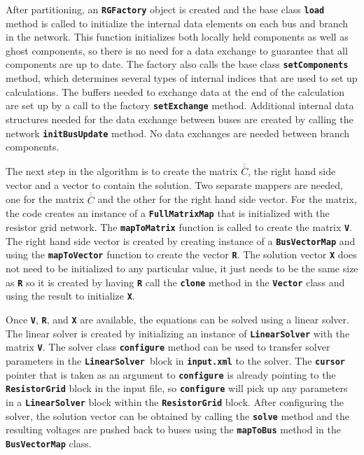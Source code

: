 After partitioning, an \texttt{\textbf{RGFactory}} object is created and the base class \texttt{\textbf{load}} method is called to initialize the internal data elements on each bus and branch in the network. This function initializes both locally held components as well as ghost components, so there is no need for a data exchange to guarantee that all components are up to date. The factory also calls the base class \texttt{\textbf{setComponents}} method, which determines several types of internal indices that are used to set up calculations. The buffers needed to exchange data at the end of the calculation are set up by a call to the factory \texttt{\textbf{setExchange}} method. Additional internal data structures needed for the data exchange between buses are created by calling the network \texttt{\textbf{initBusUpdate}} method. No data exchanges are needed between branch components.

The next step in the algorithm is to create the matrix
$\overline{\overline{C}}$, the right hand side vector and a vector to contain
the solution. Two separate mappers are needed, one for the matrix
$\overline{\overline{C}}$ and the other for the right hand side vector. For the
matrix, the code creates an instance of a \texttt{\textbf{FullMatrixMap}} that
is initialized with the resistor grid network. The \texttt{\textbf{mapToMatrix}}
function is called to create the matrix \texttt{\textbf{V}}. The right hand side
vector is created by creating instance of a \texttt{\textbf{BusVectorMap}} and
using the \texttt{\textbf{mapToVector}} function to create the vector
\texttt{\textbf{R}}. The solution vector \texttt{\textbf{X}} does not need to be
initialized to any particular value, it just needs to be the same size as
\texttt{\textbf{R}} so it is created by having \texttt{\textbf{R}} call the
\texttt{\textbf{clone}} method in the \texttt{\textbf{Vector}} class and using
the result to initialize \texttt{\textbf{X}}.

Once \texttt{\textbf{V}}, \texttt{\textbf{R}}, and \texttt{\textbf{X}} are available, the equations can be solved using a linear solver. The linear solver is created by initializing an instance of \texttt{\textbf{LinearSolver}} with the matrix \texttt{\textbf{V}}. The solver class \texttt{\textbf{configure}} method can be used to transfer solver parameters in the \texttt{\textbf{LinearSolver }}block in \texttt{\textbf{input.xml}} to the solver. The \texttt{\textbf{cursor}} pointer  that is taken as an argument to \texttt{\textbf{configure}} is already pointing to the \texttt{\textbf{ResistorGrid}} block in the input file, so \texttt{\textbf{configure}} will pick up any parameters in a \texttt{\textbf{LinearSolver}} block within the \texttt{\textbf{ResistorGrid}} block. After configuring the solver, the solution vector can be obtained by calling the \texttt{\textbf{solve}} method and the resulting voltages are pushed back to buses using the \texttt{\textbf{mapToBus}} method in the \texttt{\textbf{BusVectorMap}} class.

